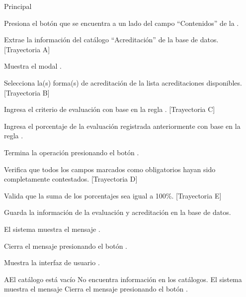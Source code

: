 \begin{UCtrayectoria}{Principal}

    \UCpaso[\UCactor] Presiona el botón \BtnModal que se encuentra a un lado del campo ``Contenidos'' de la .

    \UCpaso Extrae la información del catálogo ``Acreditación'' de la base de datos. [Trayectoria A]

    \UCpaso Muestra el modal .

    \UCpaso[\UCactor] Selecciona la(s) forma(s) de acreditación de la lista acreditaciones disponibles. [Trayectoria B]

    \UCpaso[\UCactor] Ingresa el criterio de evaluación con base en la regla . [Trayectoria C]

    \UCpaso[\UCactor] Ingresa el porcentaje de la evaluación registrada anteriormente con base en la regla .

    \UCpaso[\UCactor] Termina la operación presionando el botón .

    \UCpaso Verifica que todos los campos marcados como obligatorios hayan sido completamente contestados. [Trayectoria D]

    \UCpaso Valida que la suma de los porcentajes sea igual a 100\%. [Trayectoria E]

    \UCpaso Guarda la información de la evaluación y acreditación en la base de datos.

    \UCpaso El sistema muestra el mensaje .

    \UCpaso[\UCactor] Cierra el mensaje presionando el botón .

    \UCpaso Muestra la interfaz de usuario .
\end{UCtrayectoria}


\begin{UCtrayectoriaA}{A}{El catálogo está vacío}
    \UCpaso No encuentra información en los catálogos.
    \UCpaso El sistema muestra el mensaje 
    \UCpaso[\UCactor] Cierra el mensaje presionando el botón .
\end{UCtrayectoriaA}

